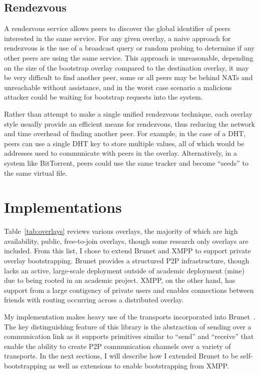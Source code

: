 \subsection{Rendezvous}
\label{bs:rendezvous}

A rendezvous service allows peers to discover the global identifier of peers
interested in the same service.  For any given overlay, a naive approach for
rendezvous is the use of a broadcast query or random probing to determine if
any other peers are using the same service.  This approach is unreasonable,
depending on the size of the bootstrap overlay compared to the destination
overlay, it may be very difficult to find another peer, some or all peers may
be behind NATs and unreachable without assistance, and in the worst case
scenario a malicious attacker could be waiting for bootstrap requests into the
system.

Rather than attempt to make a single unified rendezvous technique, each overlay
style usually provide an efficient means for rendezvous, thus reducing the
network and time overhead of finding another peer.  For example, in the case of
a DHT, peers can use a single DHT key to store multiple values, all of which
would be addresses used to communicate with peers in the overlay.
Alternatively, in a system like BitTorrent, peers could use the same tracker
and become ``seeds'' to the same virtual file.

\section{Implementations}
\label{bs:implementation}

Table~\ref{tab:overlays} reviews various overlays, the majority of which are
high availability, public, free-to-join overlays, though some research only
overlays are included.  From this list, I chose to extend Brunet and XMPP to
support private overlay bootstrapping.  Brunet provides a structured P2P
infrastructure, though lacks an active, large-scale deployment outside of
academic deployment (mine) due to being rooted in an academic project.  XMPP,
on the other hand, has support from a large contigency of private users and
enables connections between friends with routing occurring across a distributed
overlay.

My implementation makes heavy use of the transports incorporated into
Brunet~\cite{brunet}.  The key distinguishing feature of this library is the
abstraction of sending over a communication link as it supports primitives
similar to ``send'' and ``receive'' that enable the ability to create P2P
communication channels over a variety of transports.  In the next sections, I
will describe how I extended Brunet to be self-bootstrapping as well as
extensions to enable bootstrapping from XMPP.

